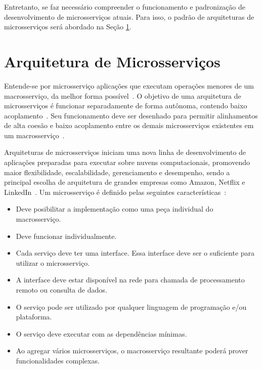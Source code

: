 Entretanto, se faz necessário compreender o funcionamento e padronização de desenvolvimento de microsserviços atuais.
%
Para isso, o padrão de arquiteturas de microsserviços será abordado na Seção \ref{sec:microsservicos}.



\section{Arquitetura de Microsserviços}
\label{sec:microsservicos}



Entende-se por microsserviço aplicações que executam operações menores de um macrosserviço, da melhor forma possível~\cite{stephenclarkewillson2017, Newman2015Feb}.
%
O objetivo de uma arquitetura de microsserviços é funcionar separadamente de forma autônoma, contendo baixo acoplamento~\cite{Newman2015Feb}.
%
Seu funcionamento deve ser desenhado para permitir alinhamentos de alta coesão e baixo acoplamento entre os demais microsserviços existentes em um macrosserviço~\cite{8169955}.



Arquiteturas de microsserviços iniciam uma nova linha de desenvolvimento de aplicações preparadas para executar sobre nuvens computacionais, promovendo maior flexibilidade, escalabilidade, gerenciamento e desempenho, sendo a principal escolha de arquitetura de grandes empresas como Amazon, Netflix e LinkedIn~\cite{7830692,7515686}.
%
Um microsserviço é definido pelas seguintes características~\cite{8169955}:



\begin{itemize}
  \item Deve posibilitar a implementação como uma peça individual do macrosserviço.
  \item Deve funcionar individualmente.
  \item Cada serviço deve ter uma interface. Essa interface deve ser o suficiente para utilizar o microsserviço.
  \item A interface deve estar disponível na rede para chamada de processamento remoto ou consulta de dados.
  \item O serviço pode ser utilizado por qualquer linguagem de programação e/ou plataforma.
  \item O serviço deve executar com as dependências mínimas.
  \item Ao agregar vários microsserviços, o macrosserviço resultante poderá prover funcionalidades complexas.
\end{itemize}

